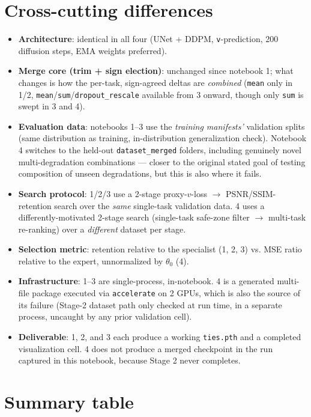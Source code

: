 \documentclass[11pt]{article}
\begin{document}
\section{Cross-cutting differences}

\begin{itemize}[nosep]
  \item \textbf{Architecture}: identical in all four (UNet + DDPM,
  \texttt{v}-prediction, 200 diffusion steps, EMA weights preferred).
  \item \textbf{Merge core (trim + sign election)}: unchanged since notebook 1;
  what changes is how the per-task, sign-agreed deltas are \emph{combined}
  (\texttt{mean} only in 1/2, \texttt{mean}/\texttt{sum}/\texttt{dropout\_rescale}
  available from 3 onward, though only \texttt{sum} is swept in 3 and 4).
  \item \textbf{Evaluation data}: notebooks 1--3 use the \emph{training
  manifests'} validation splits (same distribution as training, in-distribution
  generalization check). Notebook 4 switches to the held-out
  \texttt{dataset\_merged} folders, including genuinely novel multi-degradation
  combinations — closer to the original stated goal of testing composition of
  unseen degradations, but this is also where it fails.
  \item \textbf{Search protocol}: 1/2/3 use a 2-stage proxy-$v$-loss $\to$
  PSNR/SSIM-retention search over the \emph{same} single-task validation data.
  4 uses a differently-motivated 2-stage search (single-task safe-zone filter
  $\to$ multi-task re-ranking) over a \emph{different} dataset per stage.
  \item \textbf{Selection metric}: retention relative to the specialist
  (1, 2, 3) vs. MSE ratio relative to the expert, unnormalized by $\theta_0$
  (4).
  \item \textbf{Infrastructure}: 1--3 are single-process, in-notebook. 4 is a
  generated multi-file package executed via \texttt{accelerate} on 2 GPUs,
  which is also the source of its failure (Stage-2 dataset path only checked
  at run time, in a separate process, uncaught by any prior validation cell).
  \item \textbf{Deliverable}: 1, 2, and 3 each produce a working
  \texttt{ties.pth} and a completed visualization cell. 4 does not produce a
  merged checkpoint in the run captured in this notebook, because Stage 2
  never completes.
\end{itemize}

\section{Summary table}
\end{document}
